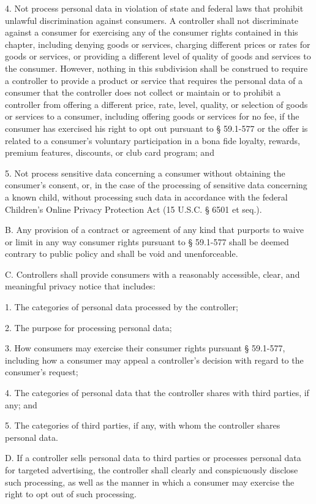 4. Not process personal data in violation of state and federal laws that prohibit unlawful discrimination against consumers. A controller shall not discriminate against a consumer for exercising any of the consumer rights contained in this chapter, including denying goods or services, charging different prices or rates for goods or services, or providing a different level of quality of goods and services to the consumer. However, nothing in this subdivision shall be construed to require a controller to provide a product or service that requires the personal data of a consumer that the controller does not collect or maintain or to prohibit a controller from offering a different price, rate, level, quality, or selection of goods or services to a consumer, including offering goods or services for no fee, if the consumer has exercised his right to opt out pursuant to § 59.1-577 or the offer is related to a consumer's voluntary participation in a bona fide loyalty, rewards, premium features, discounts, or club card program; and

5. Not process sensitive data concerning a consumer without obtaining the consumer's consent, or, in the case of the processing of sensitive data concerning a known child, without processing such data in accordance with the federal Children's Online Privacy Protection Act (15 U.S.C. § 6501 et seq.).

B. Any provision of a contract or agreement of any kind that purports to waive or limit in any way consumer rights pursuant to § 59.1-577 shall be deemed contrary to public policy and shall be void and unenforceable.

C. Controllers shall provide consumers with a reasonably accessible, clear, and meaningful privacy notice that includes:

1. The categories of personal data processed by the controller;

2. The purpose for processing personal data;

3. How consumers may exercise their consumer rights pursuant § 59.1-577, including how a consumer may appeal a controller's decision with regard to the consumer's request;

4. The categories of personal data that the controller shares with third parties, if any; and

5. The categories of third parties, if any, with whom the controller shares personal data.

D. If a controller sells personal data to third parties or processes personal data for targeted advertising, the controller shall clearly and conspicuously disclose such processing, as well as the manner in which a consumer may exercise the right to opt out of such processing.

